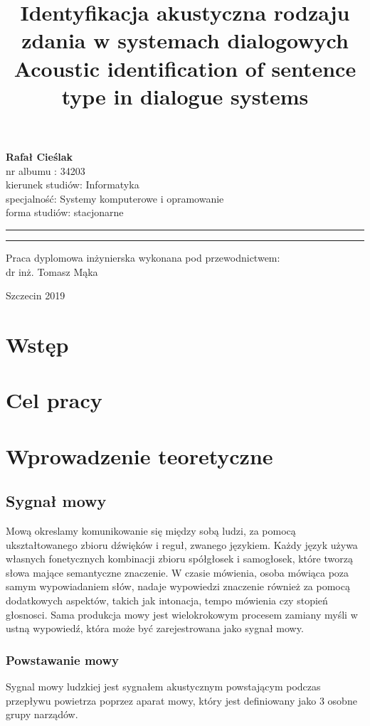 \documentclass[a4paper,12 pt]{article}
\title{Identyfikacja akustyczna rodzaju zdania w systemach dialogowych	\newline \newline Acoustic identification of sentence type in dialogue systems	}
\makeatletter
\newcommand{\linia}{\rule{\linewidth}{0.4mm}}
\renewcommand{\maketitle}{\begin{titlepage}
    \vspace*{1cm}
    \begin{center}\small
   \textbf{ Rafał Cieślak}\\
    nr albumu : 34203\\
    kierunek studiów: Informatyka\\
    specjalność: Systemy komputerowe i opramowanie\\
    forma studiów: stacjonarne
    \end{center}
    \vspace{3cm}
    \noindent\linia
    \begin{center}
      \textbf{ \textsc{\@title}}
         \end{center}
     \linia
    \vspace{0.5cm}
    \begin{flushright}

    \vspace{5cm}
        \begin{center}\small
     {\small Praca dyplomowa inżynierska wykonana pod przewodnictwem:}\\
         dr inż. Tomasz Mąka
             \end{center}
     \end{flushright}
    \vspace*{\stretch{6}}
    \begin{center}
   Szczecin 2019
    \end{center}
  \end{titlepage}%
}
\makeatother
\begin{document}
\maketitle




\newpage
\tableofcontents
\listoffigures
\listoftables

\listofmycapequs

\newpage
\section{Wstęp}

\newpage
\section{Cel pracy}

\newpage
\section{Wprowadzenie teoretyczne}
\subsection{Sygnał mowy}
Mową okreslamy komunikowanie się między sobą ludzi, za pomocą ukształtowanego zbioru dźwięków i reguł, zwanego językiem. Każdy język używa własnych fonetycznych kombinacji zbioru spółgłosek i samogłosek, które tworzą słowa mające semantyczne znaczenie. W czasie mówienia, osoba mówiąca poza samym wypowiadaniem słów, nadaje wypowiedzi znaczenie również za pomocą dodatkowych aspektów, takich jak intonacja, tempo mówienia czy stopień głosnosci.
Sama produkcja mowy jest wielokrokowym procesem zamiany myśli w ustną wypowiedź, która może być zarejestrowana jako sygnał mowy.


 
\subsubsection{Powstawanie mowy}

Sygnal mowy ludzkiej jest sygnałem akustycznym powstającym podczas przepływu powietrza poprzez aparat mowy, który jest definiowany jako 3 osobne grupy narządów. 
\end{document}
